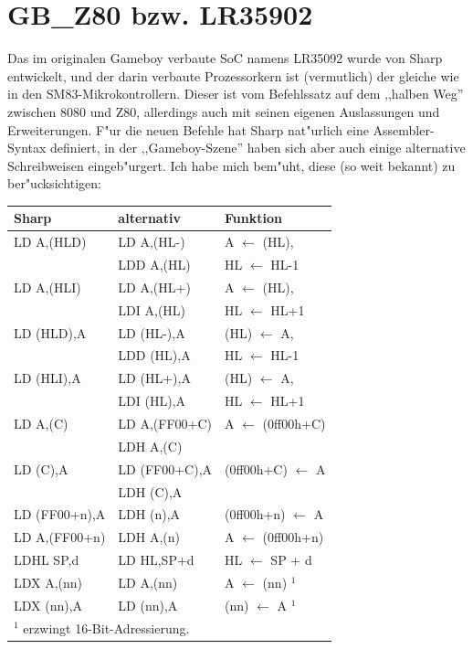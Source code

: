 \documentclass[12pt,a4paper,twoside]{report}
\begin{document}

\section{GB\_Z80 bzw. LR35902}

Das im originalen Gameboy verbaute SoC namens LR35092 wurde von Sharp
entwickelt, und der darin verbaute Prozessorkern ist (vermutlich) der gleiche
wie in den SM83-Mikrokontrollern.  Dieser ist vom Befehlssatz auf dem
,,halben Weg'' zwischen 8080 und Z80, allerdings auch mit seinen
eigenen Auslassungen und Erweiterungen.  F"ur die neuen Befehle hat
Sharp nat"urlich eine Assembler-Syntax definiert, in der
,,Gameboy-Szene'' haben sich aber auch einige alternative
Schreibweisen eingeb"urgert.  Ich habe mich bem"uht, diese (so weit
bekannt) zu ber"ucksichtigen:

\begin{center}\begin{tabular}{|l|l|l|}
\hline
Sharp & alternativ & Funktion \\
\hline
\hline
LD A,(HLD)    & LD A,(HL-)  & A $\longleftarrow$ (HL), \\
              & LDD A,(HL)  & HL $\longleftarrow$ HL-1 \\
\hline
LD A,(HLI)    & LD A,(HL+)  & A $\longleftarrow$ (HL), \\
              & LDI A,(HL)  & HL $\longleftarrow$ HL+1 \\
\hline
LD (HLD),A    & LD (HL-),A  & (HL) $\longleftarrow$ A, \\
              & LDD (HL),A  & HL $\longleftarrow$ HL-1 \\
\hline
LD (HLI),A    & LD (HL+),A  & (HL) $\longleftarrow$ A, \\
              & LDI (HL),A  & HL $\longleftarrow$ HL+1 \\
\hline
LD A,(C)      & LD A,(FF00+C) & A $\longleftarrow$ (0ff00h+C) \\
              & LDH A,(C)     & \\
\hline
LD (C),A      & LD (FF00+C),A & (0ff00h+C) $\longleftarrow$ A \\
              & LDH (C),A     & \\
\hline
LD (FF00+n),A & LDH (n),A     & (0ff00h+n) $\longleftarrow$ A \\
\hline
LD A,(FF00+n) & LDH A,(n)     & A $\longleftarrow$ (0ff00h+n) \\
\hline
LDHL SP,d     & LD HL,SP+d    & HL $\longleftarrow$ SP + d \\
\hline
LDX A,(nn)    & LD A,(nn)     & A $\longleftarrow$ (nn) $^{1}$ \\
\hline
LDX (nn),A    & LD (nn),A     & (nn) $\longleftarrow$ A $^{1}$ \\
\hline
\multicolumn{3}{|l|}{$^{1}$ erzwingt 16-Bit-Adressierung. } \\
\hline
\end{tabular}\end{center}
 
\end{document}
